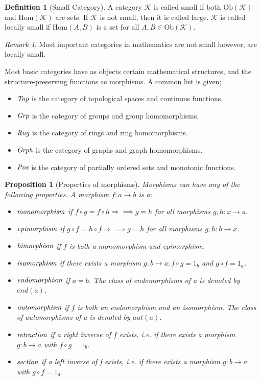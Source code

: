 \documentclass[10pt, oneside, reqno]{amsart}
\theoremstyle{plain}%
\newtheorem{prop}[thm]{Proposition}
\theoremstyle{definition}
\newtheorem{defn}[thm]{Definition}
\theoremstyle{remark}
\newtheorem*{rem}{Remark}
\newcommand{\Cat}{\mathcal{K}}
\begin{document}
\begin{defn}[Small Category]
	A category $\Cat$ is called small if both $\text{Ob}(\Cat)$ and $\text{Hom}(\Cat)$ are sets.
	If $\Cat$ is not small, then it is called large.
	$\Cat$ is called locally small if $\text{Hom}(A,B)$ is a set for all $A, B \in \text{Ob}(\Cat)$.
\end{defn}

\begin{rem}
	Most important categories in mathematics are not small however, are locally small.
\end{rem}

Most basic categories have as objects certain mathematical structures, and the structure-preserving
functions as morphisms. A common list is given;
\begin{itemize}
\item $\emph{Top}$ is the category of topological spaces and continous functions.
\item $\emph{Grp}$ is the category of groups and group homomorphisms.
\item $\emph{Rng}$ is the category of rings and ring homomorphisms.
\item $\emph{Grph}$ is the category of graphs and graph homomorphisms.
\item $\emph{Pos}$ is the category of partially ordered sets and monotonic functions.
\end{itemize}

\begin{prop}[Properties of morphisms]
Morphisms can have any of the following properties. A morphism $f: a \to b$ is a:
\begin{itemize}
\item $\emph{monomorphism}$ if $f \circ g = f \circ h \Rightarrow\implies g = h$ for all morphisms $g,h: x \to a$.
\item $\emph{epimorphism}$ if $g \circ f = h \circ f \Rightarrow\implies g = h$ for all morphisms $g,h: b \to x$.
\item $\emph{bimorphism}$ if $f$ is both a monomorphism and epimorphism.
\item $\emph{isomorphism}$ if there exists a morphism $g: b \to a : f \circ g = 1_{b}$
 and $g \circ f = 1_{a}$.
\item $\emph{endomorphism}$ if $a = b$.
The class of endomorphisms of a is denoted by $end(a)$.
\item $\emph{automorphism}$ if $f$ is both an endomorphism and an isomorphism.
The class of automorphisms of a is denoted by $aut(a)$.
\item $\emph{retraction}$ if a right inverse of $f$ exists,
 i.e. if there exists a morphism $g: b \to a$ with $f \circ g = 1_{b}$.
\item $\emph{section}$ if a left inverse of f exists,
 i.e. if there exists a morphism $g: b \to a$ with $g \circ f = 1_{a}$.
\end{itemize}
\end{prop}
\end{document}
